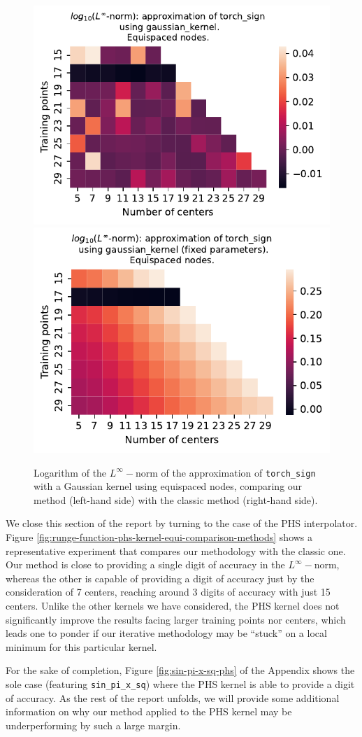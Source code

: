 \documentclass[12pt]{report} %
\begin{document}
\begin{figure}[ht]
    \centering
    \includegraphics[width=.49\textwidth]{imagenes/experiments/1d/variational/torch_sign-Kgaussian_kernel-Equi.pdf}
    \includegraphics[width=.49\textwidth]{imagenes/experiments/1d/least_squares/opt-torch_sign-Kgaussian_kernel-Equi.pdf}
    \caption{Logarithm of the $L^\infty-$norm of the approximation of \texttt{torch\_sign} with a Gaussian kernel using equispaced nodes, comparing our method (left-hand side) with the classic method (right-hand side).}
    \label{fig:torch-sign-gaussian-kernel-equi-comparison-methods}
\end{figure}


We close this section of the report by turning to the case of the PHS interpolator. Figure \ref{fig:runge-function-phs-kernel-equi-comparison-methods} shows a representative experiment that compares our methodology with the classic one. Our method is close to providing a single digit of accuracy in the $L^\infty-$norm, whereas the other is capable of providing a digit of accuracy just by the consideration of 7 centers, reaching around 3 digits of accuracy with just 15 centers. Unlike the other kernels we have considered, the PHS kernel does not significantly improve the results facing larger training points nor centers, which leads one to ponder if our iterative methodology may be ``stuck'' on a local minimum for this particular kernel.

For the sake of completion, Figure \ref{fig:sin-pi-x-sq-phs} of the Appendix shows the sole case (featuring \texttt{sin\_pi\_x\_sq}) where the PHS kernel is able to provide a digit of accuracy.
As the rest of the report unfolds, we will provide some additional information on why our method applied to the PHS kernel may be underperforming by such a large margin. 
\end{document}
